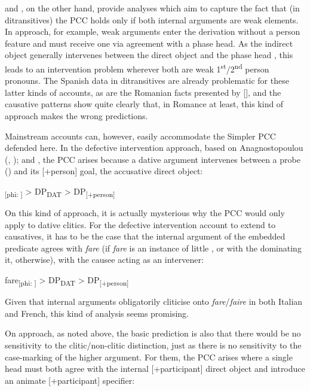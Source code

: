 \documentclass[output=paper,colorlinks,citecolor=brown,nonflat]{langsci/langscibook}
\begin{document}
\citet{Bianchi2006} and \citet{Stegovec2017}, on the other hand, provide analyses which aim to capture the fact that (in ditransitives) the PCC holds only if both internal arguments are weak elements. In  approach, for example, weak arguments enter the derivation without a person feature and must receive one via agreement with a phase head. As the indirect object generally intervenes between the direct object and the phase head {\liv}, this leads to an intervention problem wherever both are weak 1\textsuperscript{st}/2\textsuperscript{nd} person pronouns. The Spanish data in ditransitives are already problematic for these latter kinds of accounts, as are the Romanian facts presented by  [], and the causative patterns show quite clearly that, in Romance at least, this kind of approach makes the wrong predictions.

Mainstream accounts can, however, easily accommodate the Simpler PCC defended here. In the defective intervention approach, based on Anagnostopoulou (\citeyear{Anagnostopoulou2003}, \citeyear{Anagnostopoulou2005}); \citet{BéjarRezac2003} and \citet{Rezac2008}, the PCC arises because a dative argument intervenes between a probe ({\liv}) and its [+person] goal, the accusative direct object:

\ea%
    \label{ex:sheehan:37}
    {\liv}\textsubscript{[phi: ]}    > DP\textsubscript{DAT} >     DP\textsubscript{[+person]}
\z

On this kind of approach, it is actually mysterious why the PCC would only apply to dative clitics. For the defective intervention account to extend to causatives, it has to be the case that the internal argument of the embedded predicate agrees with \textit{fare} (if \textit{fare} is an instance of little {\liv}, or with the {\liv} dominating it, otherwise), with the causee acting as an intervener:

\ea%
    \label{ex:sheehan:38}
    fare\textsubscript{[phi: ]}   >  DP\textsubscript{DAT} >   DP\textsubscript{[+person]}
\z

Given that internal arguments obligatorily cliticise onto \textit{fare}/\textit{faire} in both Italian and French, this kind of analysis seems promising.

On  approach, as noted above, the basic prediction is also that there would be no sensitivity to the clitic/non-clitic distinction, just as there is no sensitivity to the case-marking of the higher argument. For them, the PCC arises where a single head must both agree with the internal [+participant] direct object and introduce an animate [+participant] specifier:
\end{document}

